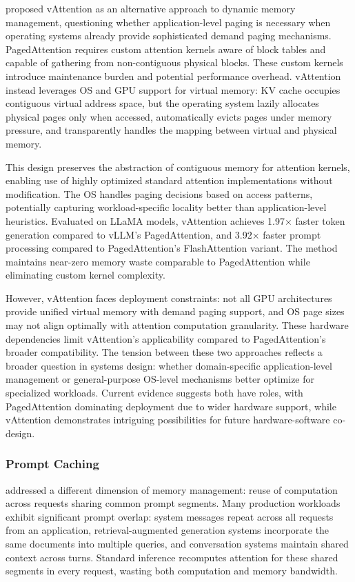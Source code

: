 \citet{liu2024vattention} proposed vAttention as an alternative approach to dynamic memory management, questioning whether application-level paging is necessary when operating systems already provide sophisticated demand paging mechanisms. PagedAttention requires custom attention kernels aware of block tables and capable of gathering from non-contiguous physical blocks. These custom kernels introduce maintenance burden and potential performance overhead. vAttention instead leverages OS and GPU support for virtual memory: KV cache occupies contiguous virtual address space, but the operating system lazily allocates physical pages only when accessed, automatically evicts pages under memory pressure, and transparently handles the mapping between virtual and physical memory.

This design preserves the abstraction of contiguous memory for attention kernels, enabling use of highly optimized standard attention implementations without modification. The OS handles paging decisions based on access patterns, potentially capturing workload-specific locality better than application-level heuristics. Evaluated on LLaMA models, vAttention achieves 1.97$\times$ faster token generation compared to vLLM's PagedAttention, and 3.92$\times$ faster prompt processing compared to PagedAttention's FlashAttention variant. The method maintains near-zero memory waste comparable to PagedAttention while eliminating custom kernel complexity.

However, vAttention faces deployment constraints: not all GPU architectures provide unified virtual memory with demand paging support, and OS page sizes may not align optimally with attention computation granularity. These hardware dependencies limit vAttention's applicability compared to PagedAttention's broader compatibility. The tension between these two approaches reflects a broader question in systems design: whether domain-specific application-level management or general-purpose OS-level mechanisms better optimize for specialized workloads. Current evidence suggests both have roles, with PagedAttention dominating deployment due to wider hardware support, while vAttention demonstrates intriguing possibilities for future hardware-software co-design.

\subsubsection{Prompt Caching}

\citet{gao2024prompt} addressed a different dimension of memory management: reuse of computation across requests sharing common prompt segments. Many production workloads exhibit significant prompt overlap: system messages repeat across all requests from an application, retrieval-augmented generation systems incorporate the same documents into multiple queries, and conversation systems maintain shared context across turns. Standard inference recomputes attention for these shared segments in every request, wasting both computation and memory bandwidth.


